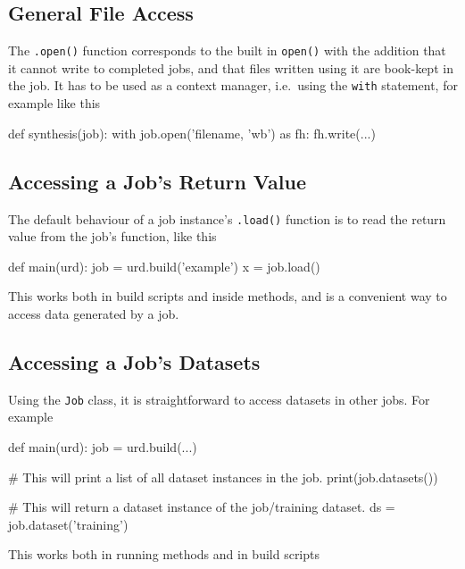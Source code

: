 \subsection{General File Access}
The \texttt{.open()} function corresponds to the built in
\texttt{open()} with the addition that it cannot write to completed
jobs, and that files written using it are book-kept in the job.  It
has to be used as a context manager, i.e.\ using the \texttt{with}
statement, for example like this
\begin{python}
def synthesis(job):
    with job.open('filename, 'wb') as fh:
        fh.write(...)
\end{python}


\subsection{Accessing a Job's Return Value}
The default behaviour of a job instance's \texttt{.load()} function is
to read the return value from the job's \synthesis function, like this
\begin{python}
def main(urd):
    job = urd.build('example')
    x = job.load()
\end{python}
This works both in build scripts and inside methods, and is a
convenient way to access data generated by a job.


\subsection{Accessing a Job's Datasets}
Using the \texttt{Job} class, it is straightforward to access datasets
in other jobs.  For example
\begin{python}
def main(urd):
    job = urd.build(...)

    # This will print a list of all dataset instances in the job.
    print(job.datasets())

    # This will return a dataset instance of the job/training dataset.
    ds = job.dataset('training')
\end{python}
This works both in running methods and in build scripts


